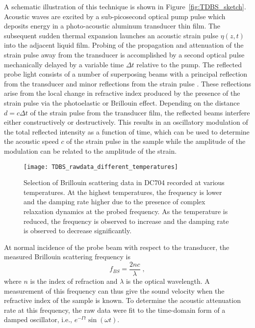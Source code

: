 \documentclass[reprint,showpacs,amsmath,amssymb,aip,jcp]{revtex4-1}
\begin{document}
A schematic illustration of this technique is shown in
Figure~\ref{fig:TDBS_sketch}. Acoustic waves are excited by a
sub-picosecond optical pump pulse which deposits energy in a
photo-acoustic aluminum transducer thin film. The subsequent sudden
thermal expansion launches an acoustic strain pulse $\eta(z,t)$ into
the adjacent liquid film. Probing of the propagation and attenuation
of the strain pulse away from the transducer is accomplished by a
second optical pulse mechanically delayed by a variable time $\Delta
t$ relative to the pump. The reflected probe light consists of a
number of superposing beams with a principal reflection from the
transducer and minor reflections from the strain pulse
\cite{sThomsen1986, sLin1991}. These reflections arise from the local
change in refractive index produced by the presence of the strain
pulse via the photoelastic or Brillouin effect. Depending on the
distance $d=c\Delta t$ of the strain pulse from the transducer film,
the reflected beams interfere either constructively or
destructively. This results in an oscillatory modulation of the total
reflected intensity as a function of time, which can be used to
determine the acoustic speed $c$ of the strain pulse in the sample
while the amplitude of the modulation can be related to the amplitude
of the strain.

\begin{figure}
  \texttt{[image: TDBS\_rawdata\_different\_temperatures]}
  \caption{\label{fig:TDBS_rawdata}Selection of Brillouin scattering
    data in DC704 recorded at various temperatures. At the highest
    temperatures, the frequency is lower and the damping rate higher
    due to the presence of complex relaxation dynamics at the probed
    frequency. As the temperature is reduced, the frequency is
    observed to increase and the damping rate is observed to decrease
    significantly.}
\end{figure}

At normal incidence of the probe beam with respect to the transducer,
the measured Brillouin scattering frequency is
\begin{equation}
  f_{BS} = \frac{2nc}{\lambda} \; ,\label{eq:BS_frequency}
\end{equation}
where $n$ is the index of refraction and $\lambda$ is the optical
wavelength. A measurement of this frequency can thus give the sound
velocity when the refractive index of the sample is known. To
determine the acoustic attenuation rate at this frequency, the raw
data were fit to the time-domain form of a damped oscillator, i.e.,
$e^{-\Gamma t}\sin\left(\omega t\right)$.
\end{document}
